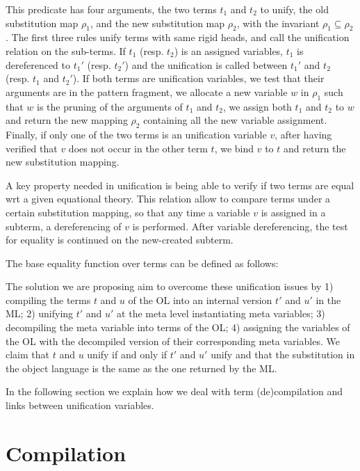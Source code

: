 \documentclass[sigconf,natbib=false]{acmart}
\begin{document}
This predicate has four
arguments, the two terms $t_1$ and $t_2$ to unify, the old substitution map
$\rho_1$, and the new substitution map $\rho_2$, with the invariant $\rho_1
\subseteq \rho_2$. The first three rules unify terms with same rigid heads, and
call the unification relation on the sub-terms. If $t_1$ (resp. $t_2$) is an
assigned variables, $t_1$ is dereferenced to $t_1'$ (resp. $t_2'$) and the
unification is called between $t_1'$ and $t_2$ (resp. $t_1$ and $t_2'$). If both
terms are unification variables, we test that their arguments are in the pattern
fragment, we allocate a new variable $w$ in $\rho_1$ such that $w$ is the
pruning of the arguments of $t_1$ and $t_2$, we assign both $t_1$ and $t_2$ to
$w$ and return the new mapping $\rho_2$ containing all the new variable
assignment. Finally, if only one of the two terms is an unification variable
$v$, after having verified that $v$ does not occur in the other term $t$, we
bind $v$ to $t$ and return the new substitution mapping.

\old

A key property needed in unification is being able to verify if two terms are
equal wrt a given equational theory. This relation allow to compare terms under
a certain substitution mapping, so that any time a variable $v$ is assigned in a
subterm, a dereferencing of $v$ is performed. After variable dereferencing, the
test for equality is continued on the new-created subterm.

The base equality function over terms can be defined as follows:

The solution we are proposing aim to overcome these unification issues by 1)
compiling the terms $t$ and $u$ of the OL into an internal version $t'$ and $u'$
in the ML; 2) unifying $t'$ and $u'$ at the meta level instantiating meta
variables; 3) decompiling the meta variable into terms of the OL; 4) assigning
the variables of the OL with the decompiled version of their corresponding meta
variables. We claim that $t$ and $u$ unify if and only if $t'$ and $u'$ unify
and that the substitution in the object language is the same as the one returned
by the ML.  

In the following section we explain how we deal with term (de)compilation and
links between unification variables.

\section[Compilation: fo\_tm to tm]{Compilation}
\label{sec:compilation}
\end{document}
